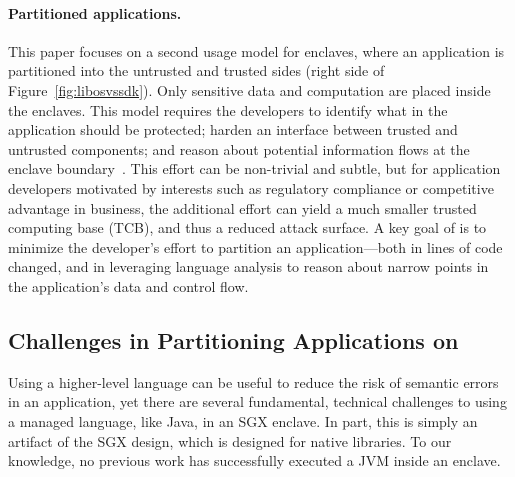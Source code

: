\paragraph{Partitioned applications.}
This paper focuses on a second usage model for enclaves, where an application is partitioned into
the untrusted and trusted sides (right side of Figure~\ref{fig:libosvssdk}).
Only sensitive data and computation are placed inside the enclaves.
This model requires the developers to
identify what in the application should be protected; harden an interface between trusted and untrusted components; 
and reason about potential information flows at the enclave boundary~\citep{kilpatrick2003privman}.
This effort can be non-trivial and subtle, but for application developers motivated by interests such as 
regulatory compliance or competitive advantage in business, the additional effort can yield a much smaller trusted computing
base (TCB), and thus a reduced attack surface.
A key goal of \sysname{} is to minimize the developer's effort to partition an application---both in lines of 
code changed, and in leveraging language analysis to reason about narrow points in the application's data and control flow.

\subsection{Challenges in Partitioning \java{} Applications on \sgx{}}

Using a higher-level language can be useful to reduce the risk of semantic errors in an application,
yet there are several fundamental, technical challenges to using a managed language, like Java,
in an SGX enclave.
In part, this is simply an artifact of the SGX design, which is designed
for native libraries.
To our knowledge, no previous work has successfully executed a JVM inside an enclave.

  
